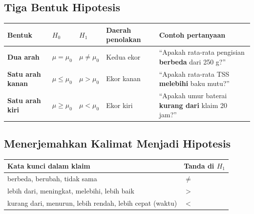 \documentclass[
  indonesian,
  letterpaper,
]{book}
\newcounter{none} %
\begin{document}
\subsection{Tiga Bentuk Hipotesis}\label{tiga-bentuk-hipotesis}

{\def\LTcaptype{none} %
\begin{longtable}[]{@{}
  >{\raggedright\arraybackslash}p{}
  >{\raggedright\arraybackslash}p{}
  >{\raggedright\arraybackslash}p{}
  >{\raggedright\arraybackslash}p{}
  >{\raggedright\arraybackslash}p{}@{}}
\toprule\noalign{}
\begin{minipage}[b]{\linewidth}\raggedright
Bentuk
\end{minipage} & \begin{minipage}[b]{\linewidth}\raggedright
\(H_0\)
\end{minipage} & \begin{minipage}[b]{\linewidth}\raggedright
\(H_1\)
\end{minipage} & \begin{minipage}[b]{\linewidth}\raggedright
Daerah penolakan
\end{minipage} & \begin{minipage}[b]{\linewidth}\raggedright
Contoh pertanyaan
\end{minipage} \\
\midrule\noalign{}
\endhead
\bottomrule\noalign{}
\endlastfoot
\textbf{Dua arah} & \(\mu = \mu_0\) & \(\mu \neq \mu_0\) & Kedua ekor &
``Apakah rata-rata pengisian \textbf{berbeda} dari 250 g?'' \\
\textbf{Satu arah kanan} & \(\mu \leq \mu_0\) & \(\mu > \mu_0\) & Ekor
kanan & ``Apakah rata-rata TSS \textbf{melebihi} baku mutu?'' \\
\textbf{Satu arah kiri} & \(\mu \geq \mu_0\) & \(\mu < \mu_0\) & Ekor
kiri & ``Apakah umur baterai \textbf{kurang dari} klaim 20 jam?'' \\
\end{longtable}
}

\subsection{Menerjemahkan Kalimat Menjadi
Hipotesis}\label{menerjemahkan-kalimat-menjadi-hipotesis}

{\def\LTcaptype{none} %
\begin{longtable}[]{@{}ll@{}}
\toprule\noalign{}
Kata kunci dalam klaim & Tanda di \(H_1\) \\
\midrule\noalign{}
\endhead
\bottomrule\noalign{}
\endlastfoot
berbeda, berubah, tidak sama & \(\neq\) \\
lebih dari, meningkat, melebihi, lebih baik & \(>\) \\
kurang dari, menurun, lebih rendah, lebih cepat (waktu) & \(<\) \\
\end{longtable}
}
\end{document}
